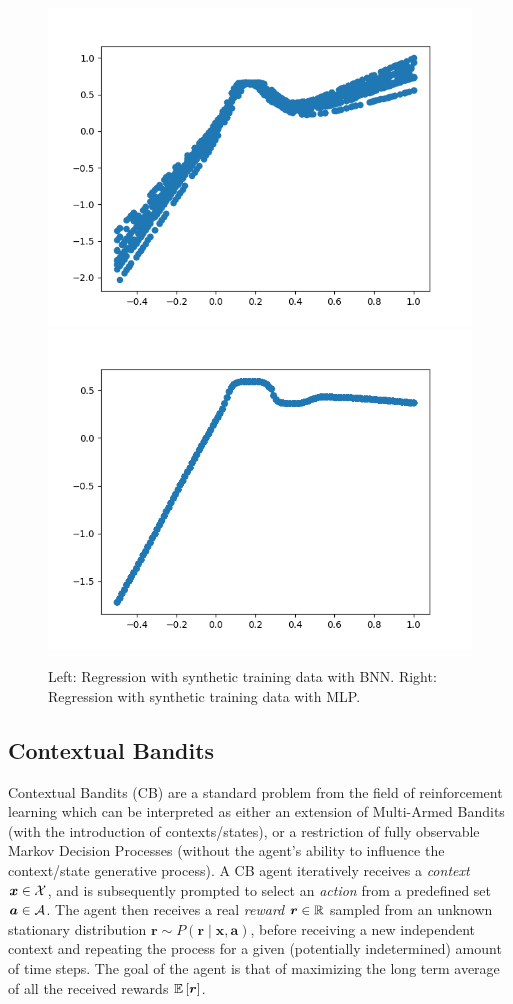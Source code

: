\documentclass[11pt]{article}
\begin{document}
\begin{figure}
  \centering\includegraphics[width=.45\textwidth]{figures/reg_bnn_extended.png}
  \centering\includegraphics[width=.45\textwidth]{figures/reg_mlp_extended.png}
  \caption{Left: Regression with synthetic training data with BNN.
  Right: Regression with synthetic training data with MLP.}
  \label{fig:reg_extended}
\end{figure}

\subsection{Contextual Bandits}

Contextual Bandits (CB) are a standard problem from the field of reinforcement
learning which can be interpreted as either an extension of Multi-Armed Bandits
(with the introduction of contexts/states), or a restriction of fully
observable Markov Decision Processes (without the agent's ability to influence
the context/state generative process).  A CB agent iteratively receives
a \emph{context} $\bm x\in{\mathcal{X}}$, and is subsequently prompted to select an
\emph{action} from a predefined set $\bm a\in{\mathcal{A}}$.  The agent then receives
a real \emph{reward} $\bm r\in{\mathbb{R}}$ sampled from an unknown stationary
distribution $\bm r\sim P(\bm r\mid \bm x, \bm a)$, before receiving a new
independent context and repeating the process for a given (potentially
indetermined) amount of time steps.  The goal of the agent is that of
maximizing the long term average of all the received rewards ${\mathbb{E}}\left[\bm
r\right]$.  
\end{document}
